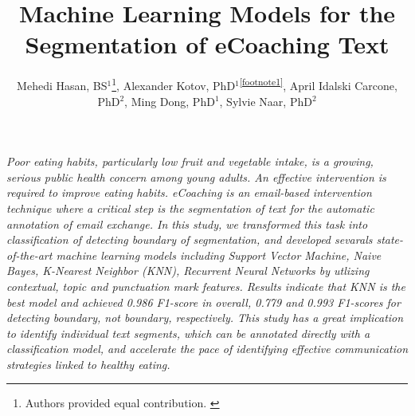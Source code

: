 \documentclass{amia}
\begin{document}
\title{Machine Learning Models for the Segmentation of eCoaching Text}

\author{Mehedi Hasan, BS$^{1}$\footnote[1]{Authors provided equal contribution. \label{footnote1}}, Alexander Kotov, PhD$^{1}$\textsuperscript{\ref{footnote1}}, April Idalski Carcone, PhD$^{2}$, Ming Dong, PhD$^{1}$, Sylvie Naar, PhD$^{2}$}


\maketitle

\textit{Poor eating habits, particularly low fruit and vegetable intake, is a growing, serious public health concern among young adults. An effective intervention is required to improve eating habits. eCoaching is an email-based intervention technique where a critical step is the segmentation of text for the automatic annotation of email exchange. In this study, we transformed this task into classification of detecting boundary of segmentation, and developed sevarals state-of-the-art machine learning models including Support Vector Machine, Naive Bayes, K-Nearest Neighbor (KNN), Recurrent Neural Networks by utlizing contextual, topic and punctuation mark features. Results indicate that KNN is the best model and achieved 0.986 F1-score in overall, 0.779 and 0.993 F1-scores for detecting boundary, not boundary, respectively. This study has a great implication to identify individual text segments, which can be annotated directly with a classification model, and accelerate the pace of identifying effective communication strategies linked to healthy eating.}
\end{document}
